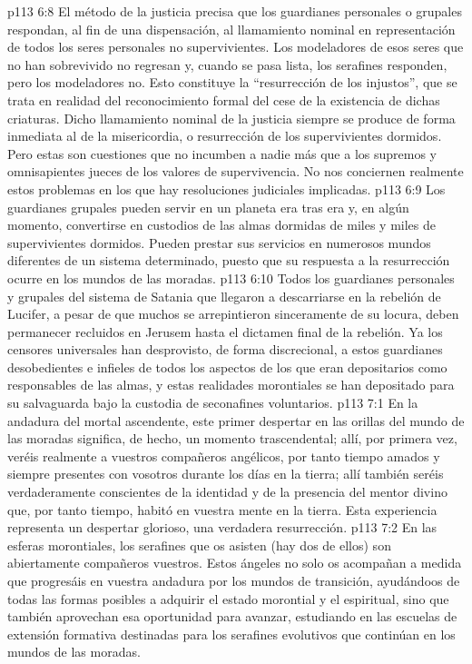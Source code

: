 \vs p113 6:8 \pc El método de la justicia precisa que los guardianes personales o grupales respondan, al fin de una dispensación, al llamamiento nominal en representación de todos los seres personales no supervivientes. Los modeladores de esos seres que no han sobrevivido no regresan y, cuando se pasa lista, los serafines responden, pero los modeladores no. Esto constituye la “resurrección de los injustos”, que se trata en realidad del reconocimiento formal del cese de la existencia de dichas criaturas. Dicho llamamiento nominal de la justicia siempre se produce de forma inmediata al de la misericordia, o resurrección de los supervivientes dormidos. Pero estas son cuestiones que no incumben a nadie más que a los supremos y omnisapientes jueces de los valores de supervivencia. No nos conciernen realmente estos problemas en los que hay resoluciones judiciales implicadas.
\vs p113 6:9 \pc Los guardianes grupales pueden servir en un planeta era tras era y, en algún momento, convertirse en custodios de las almas dormidas de miles y miles de supervivientes dormidos. Pueden prestar sus servicios en numerosos mundos diferentes de un sistema determinado, puesto que su respuesta a la resurrección ocurre en los mundos de las moradas.
\vs p113 6:10 Todos los guardianes personales y grupales del sistema de Satania que llegaron a descarriarse en la rebelión de Lucifer, a pesar de que muchos se arrepintieron sinceramente de su locura, deben permanecer recluidos en Jerusem hasta el dictamen final de la rebelión. Ya los censores universales han desprovisto, de forma discrecional, a estos guardianes desobedientes e infieles de todos los aspectos de los que eran depositarios como responsables de las almas, y estas realidades morontiales se han depositado para su salvaguarda bajo la custodia de seconafines voluntarios.
\vs p113 7:1 En la andadura del mortal ascendente, este primer despertar en las orillas del mundo de las moradas significa, de hecho, un momento trascendental; allí, por primera vez, veréis realmente a vuestros compañeros angélicos, por tanto tiempo amados y siempre presentes con vosotros durante los días en la tierra; allí también seréis verdaderamente conscientes de la identidad y de la presencia del mentor divino que, por tanto tiempo, habitó en vuestra mente en la tierra. Esta experiencia representa un despertar glorioso, una verdadera resurrección.
\vs p113 7:2 En las esferas morontiales, los serafines que os asisten (hay dos de ellos) son abiertamente compañeros vuestros. Estos ángeles no solo os acompañan a medida que progresáis en vuestra andadura por los mundos de transición, ayudándoos de todas las formas posibles a adquirir el estado morontial y el espiritual, sino que también aprovechan esa oportunidad para avanzar, estudiando en las escuelas de extensión formativa destinadas para los serafines evolutivos que continúan en los mundos de las moradas.
